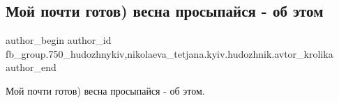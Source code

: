  
 
 
 
 

\subsection{Мой почти готов) весна просыпайся - об этом}
\label{sec:30_03_2018.fb.fb_group.750_hudozhnykiv.2.moj_pochti_gotov_vesna_prosypajsja}
 
\ifcmt
 author_begin
   author_id fb_group.750_hudozhnykiv,nikolaeva_tetjana.kyiv.hudozhnik.avtor_krolika
 author_end
\fi

Мой почти готов) весна просыпайся - об этом.

